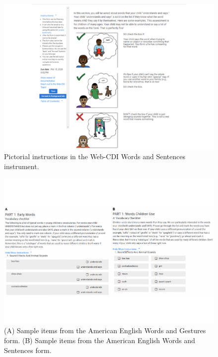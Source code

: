 \documentclass[
  english,
  ,man,floatsintext]{apa6}
\begin{document}
\begin{figure}
\centering
\includegraphics{webcdi_paper_files/figure-latex/pictorial-1.pdf}
\caption{\label{fig:pictorial}Pictorial instructions in the Web-CDI Words and Sentences instrument.}
\end{figure}

\begin{figure}
\centering
\includegraphics{webcdi_paper_files/figure-latex/firstitems-1.pdf}
\caption{\label{fig:firstitems}(A) Sample items from the American English Words and Gestures form. (B) Sample items from the American English Words and Sentences form.}
\end{figure}
\end{document}
